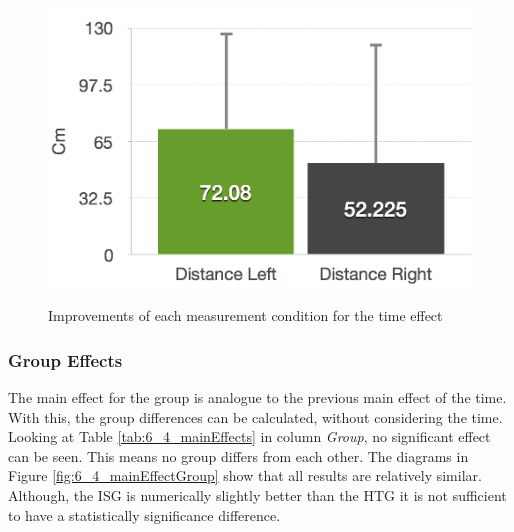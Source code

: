 \begin{figure}[htb]
		\hfill
	\begin{minipage}[t]{0.32\linewidth}
		\centering
		\includegraphics[width=1\linewidth]{Pictures/6_4_DIA_DistanceAllDiff}
		\label{fig:6_4_distanceAllDiff}
	\end{minipage}
	\caption{Improvements of each measurement condition for the time effect}
	\label{fig:6_4_timeImprovement}
\end{figure}

\subsubsection{Group Effects}
The main effect for the group is analogue to the previous main effect of the time.
With this, the group differences can be calculated, without considering the time.
Looking at Table \ref{tab:6_4_mainEffects} in column \textit{Group}, no significant effect can be seen.
This means no group differs from each other.
The diagrams in Figure \ref{fig:6_4_mainEffectGroup} show that all results are relatively similar.
Although, the ISG is numerically slightly better than the HTG it is not sufficient to have a statistically significance difference.

